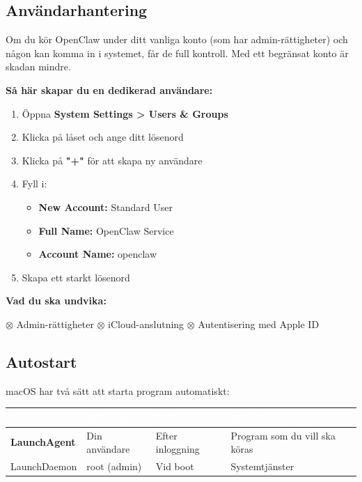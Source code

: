 \documentclass[12pt,a4paper,swedish]{article}
\begin{document}
\subsection{Användarhantering}
\label{sec:anvandare}

Om du kör OpenClaw under ditt vanliga konto (som har admin-rättigheter) och någon kan komma in i systemet, får de full kontroll. Med ett begränsat konto är skadan mindre.

\bigskip

\textbf{Så här skapar du en dedikerad användare:}

\begin{enumerate}
    \item Öppna \textbf{System Settings > Users \& Groups}
    \item Klicka på låset och ange ditt lösenord
    \item Klicka på \textbf{"+"} för att skapa ny användare
    \item Fyll i:
    \begin{itemize}
        \item \textbf{New Account:} Standard User
        \item \textbf{Full Name:} OpenClaw Service
        \item \textbf{Account Name:} openclaw
    \end{itemize}
    \item Skapa ett starkt lösenord
\end{enumerate}

\bigskip

\textbf{Vad du ska undvika:}
\begin{center}
\color{warning}$\otimes$\color{black} Admin-rättigheter \quad
\color{warning}$\otimes$\color{black} iCloud-anslutning \quad
\color{warning}$\otimes$\color{black} Autentisering med Apple ID
\end{center}

\subsection{Autostart}
\label{sec:autostart}

macOS har två sätt att starta program automatiskt:

\begin{center}
\begin{tabular}{|p{3cm}|p{3cm}|p{3cm}|p{4cm}|}
\hline
\rowcolor{secondary}
\textcolor{white}{\textbf{Typ}} & \textcolor{white}{\textbf{Kör som}} & \textcolor{white}{\textbf{När}} & \textcolor{white}{\textbf{Bäst för}} \\
\hline
\textbf{LaunchAgent} & Din användare & Efter inloggning & Program som du vill ska köras \\
\hline
LaunchDaemon & root (admin) & Vid boot & Systemtjänster \\
\hline
\end{tabular}
\end{center}
\end{document}
